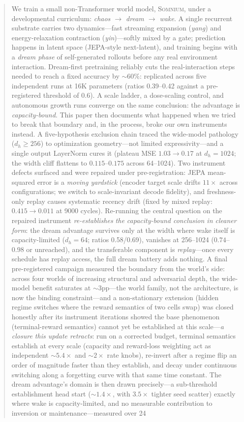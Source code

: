 \documentclass[11pt,a4paper]{article}
\newcommand{\som}{\textsc{Somnium}}
\begin{document}
\begin{abstract}
\noindent We train a small non-Transformer world model, \som{}, under a developmental curriculum: \emph{chaos $\rightarrow$ dream $\rightarrow$ wake}. A single recurrent substrate carries two dynamics---fast streaming expansion (\emph{yang}) and energy-relaxation contraction (\emph{yin})---softly mixed by a gate; prediction happens in latent space (JEPA-style next-latent), and training begins with a \emph{dream phase} of self-generated rollouts before any real environment interaction. Dream-first pretraining reliably cuts the real-interaction steps needed to reach a fixed accuracy by ${\sim}60\%$: replicated across five independent runs at 16K parameters (ratios 0.39--0.42 against a pre-registered threshold of 0.6). A scale ladder, a dose-scaling control, and autonomous growth runs converge on the same conclusion: the advantage is \emph{capacity-bound}. This paper then documents what happened when we tried to break that boundary and, in the process, broke our own instruments instead. A five-hypothesis exclusion chain traced the wide-model pathology ($d_h \ge 256$) to optimization geometry---not limited expressivity---and a single output LayerNorm cures it (plateau MSE $1.03 \rightarrow 0.17$ at $d_h{=}1024$; the width cliff flattens to $0.115$--$0.175$ across 64--1024). Two instrument defects surfaced and were repaired under pre-registration: JEPA mean-squared error is a \emph{moving yardstick} (encoder target scale drifts $11\times$ across configurations; we switch to scale-invariant decode fidelity), and freshness-only replay causes systematic recency drift (fixed by mixed replay: $0.415 \rightarrow 0.011$ at 9000 cycles). Re-running the central question on the repaired instrument \emph{re-establishes the capacity-bound conclusion in cleaner form}: the dream advantage survives only at the width where wake itself is capacity-limited ($d_h{=}64$; ratios 0.58/0.69), vanishes at 256--1024 ($0.74$--$0.98$ or unreached), and the transferable component is \emph{replay}---once every schedule has replay access, the full dream battery adds nothing. A final pre-registered campaign measured the boundary from the world's side: across four worlds of increasing structural and adversarial depth, the wide-model benefit saturates at ${\sim}3$pp---the world family, not the architecture, is now the binding constraint---and a non-stationary extension (hidden regime switches where the reward semantics of two cells swap) was closed honestly after its instrument iterations showed the base phenomenon (terminal-reward semantics) cannot yet be established at this scale---\emph{a closure this update retracts}: run on a corrected budget, terminal semantics establish at every scale (capacity and reward-loss weighting act as independent ${\sim}5.4\times$ and ${\sim}2\times$ rate knobs), re-invert after a regime flip an order of magnitude faster than they establish, and decay under continuous switching along a forgetting curve with that same time constant. The dream advantage's domain is then drawn precisely---a sub-threshold establishment head start (${\sim}1.4\times$, with $3.5\times$ tighter seed scatter) exactly where wake is capacity-limited, and no measurable contribution to inversion or maintenance---measured over 24 
\end{abstract}
\end{document}
